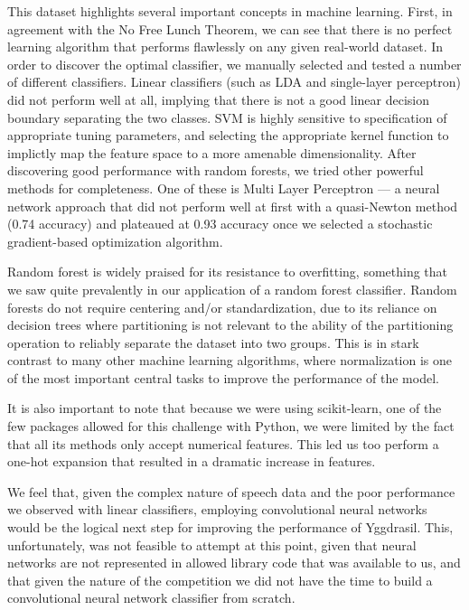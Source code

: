 \documentclass[11pt,a4paper]{article}
\begin{document}
This dataset highlights several important concepts in machine learning. First, in agreement with the No Free Lunch Theorem, we can see that there is no perfect learning algorithm that performs flawlessly on any given real-world dataset\cite{Wolpert:1997ci}. In order to discover the optimal classifier, we manually selected and tested a number of different classifiers. Linear classifiers (such as LDA and single-layer perceptron) did not perform well at all, implying that there is not a good linear decision boundary separating the two classes. SVM is highly sensitive to specification of appropriate tuning parameters, and selecting the appropriate kernel function to implictly map the feature space to a more amenable dimensionality. After discovering good performance with random forests, we tried other powerful methods for completeness. One of these is Multi Layer Perceptron --- a neural network approach that did not perform well at first with a quasi-Newton method (0.74 accuracy) and plateaued at 0.93 accuracy once we selected a stochastic gradient-based optimization algorithm\cite{Bello:1992wy}.\par 
Random forest is widely praised for its resistance to overfitting, something that we saw quite prevalently in our application of a random forest classifier. Random forests do not require centering and/or standardization, due to its reliance on decision trees where partitioning is not relevant to the ability of the partitioning operation to reliably separate the dataset into two groups. This is in stark contrast to many other machine learning algorithms, where normalization is one of the most important central tasks to improve the performance of the model.\par
It is also important to note that because we were using scikit-learn, one of the few packages allowed for this challenge with Python, we were limited by the fact that all its methods only accept numerical features. This led us too perform a one-hot expansion that resulted in a dramatic increase in features. \par
We feel that, given the complex nature of speech data and the poor performance we observed with linear classifiers, employing convolutional neural networks would be the logical next step for improving the performance of Yggdrasil. This, unfortunately, was not feasible to attempt at this point, given that neural networks are not represented in allowed library code that was available to us, and that given the nature of the competition we did not have the time to build a convolutional neural network classifier from scratch.
\end{document}
